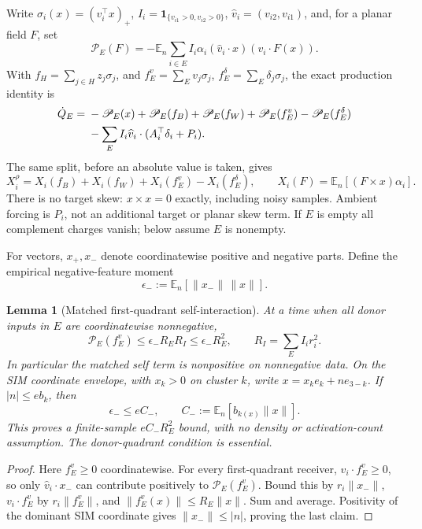 \documentclass{article} %
\theoremstyle{plain}
\newtheorem{lemma}[theorem]{Lemma}
\theoremstyle{definition}
\theoremstyle{remark}
\begin{document}
Write $\sigma_i(x)=(v_i^\top x)_+$, $I_i=\mathbf1_{\{v_{i1}>0,v_{i2}>0\}}$,
$\widehat v_i=(v_{i2},v_{i1})$, and, for a planar field $F$, set
\[
 \mathscr P_E(F)=-\mathbb E_n\sum_{i\in E}I_i\alpha_i
           (\widehat v_i\cdot x)(v_i\cdot F(x)).
\]
With $f_H=\sum_{j\in H}z_j\sigma_j$, and
$f_E^v=\sum_Ev_j\sigma_j$, $f_E^\delta=\sum_E\delta_j\sigma_j$,
the exact production identity is
\begin{align}
 \dot Q_E={}&-\mathscr P_E(x)+\mathscr P_E(f_B)
       +\mathscr P_E(f_W)+\mathscr P_E(f_E^v)
       -\mathscr P_E(f_E^\delta)\notag\\
 &-\sum_E I_i\widehat v_i\cdot(A_i^\top\delta_i+P_i).
 \label{sbcouple:exact-production}
\end{align}
The same split, before an absolute value is taken, gives
\begin{equation}\label{sbcouple:exact-skew}
 X_i^\rho=X_i(f_B)+X_i(f_W)+X_i(f_E^v)-X_i(f_E^\delta),
 \qquad X_i(F)=\mathbb E_n[(F\times x)\alpha_i].
\end{equation}
There is no target skew: $x\times x=0$ exactly, including noisy samples.
Ambient forcing is $P_i$, not an additional target or planar skew term.
If $E$ is empty all complement charges vanish; below assume $E$ is nonempty.

For vectors, $x_+,x_-$ denote coordinatewise positive and negative parts.
Define the empirical negative-feature moment
\[
 \epsilon_-:=\mathbb E_n[\|x_-\|\,\|x\|].
\]
\begin{lemma}[Matched first-quadrant self-interaction]
\label{sbcouple:self}
At a time when all donor inputs in $E$ are coordinatewise nonnegative,
\begin{equation}\label{sbcouple:self-bound}
 \mathscr P_E(f_E^v)\le\epsilon_-R_E R_I\le\epsilon_-R_E^2,
 \qquad R_I=\sum_E I_i r_i^2.
\end{equation}
In particular the matched self term is nonpositive on nonnegative data.
On the SIM coordinate envelope, with $x_k>0$ on cluster $k$, write
$x=x_ke_k+n e_{3-k}$. If $|n|\le e b_k$, then
\[
 \epsilon_-\le e C_- ,\qquad
 C_-:=\mathbb E_n[b_{k(x)}\|x\|].
\]
This proves a finite-sample $eC_-R_E^2$ bound, with no density or
activation-count assumption. The donor-quadrant condition is essential.
\end{lemma}
\begin{proof}
Here $f_E^v\ge0$ coordinatewise. For every first-quadrant receiver,
$v_i\cdot f_E^v\ge0$, so only $\widehat v_i\cdot x_-$ can contribute
positively to $\mathscr P_E(f_E^v)$. Bound this by $r_i\|x_-\|$,
$v_i\cdot f_E^v$ by $r_i\|f_E^v\|$, and
$\|f_E^v(x)\|\le R_E\|x\|$. Sum and average. Positivity of the
dominant SIM coordinate gives $\|x_-\|\le |n|$, proving the last claim.
\end{proof}
\end{document}
